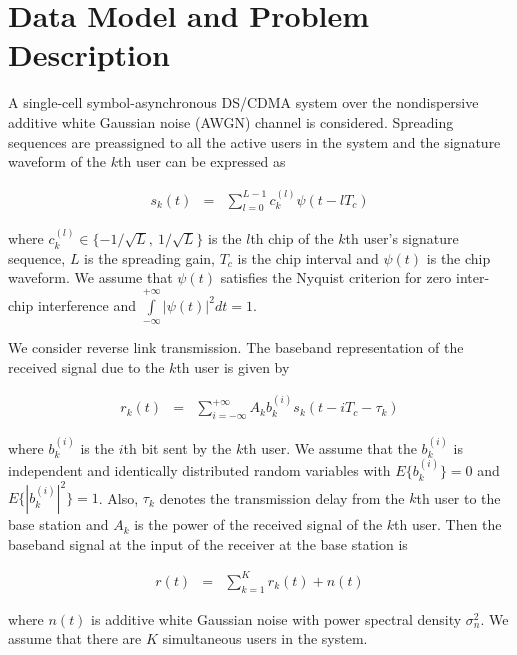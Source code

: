 \documentclass[a4paper,11pt,fleqn]{article}
\begin{document}
\section{Data Model and Problem Description}

A single-cell symbol-asynchronous DS/CDMA system over the
nondispersive additive white Gaussian noise (AWGN) channel is
considered. Spreading sequences are preassigned to all the active
users in the system and the signature waveform of the $k$th user
can be expressed as

\begin{equation}
\begin{array}{rcl}
s_k(t)&=&\sum\limits_{l=0}^{L-1}c_k^{(l)}\psi(t-lT_c)
\end{array}
\end{equation}

\noindent where $c_k^{(l)}\in \{-1/\sqrt{L},\ 1/\sqrt{L}\}$ is the
$l$th chip of the $k$th user's signature sequence, $L$ is the
spreading gain, $T_c$ is the chip interval and $\psi(t)$ is the
chip waveform. We assume that $\psi(t)$ satisfies the Nyquist
criterion for zero inter-chip interference and
$\int\limits_{-\infty}^{+\infty}|\psi(t)|^2dt=1$.

We consider reverse link transmission. The baseband representation
of the received signal due to the $k$th user is given by

\begin{equation}
\begin{array}{rcl}
r_k(t)&=&\sum\limits_{i=-\infty}^{+\infty}A_k b_k^{(i)}
s_k(t-iT_c-\tau_k)
\end{array}
\end{equation}

\noindent where $b_k^{(i)}$ is the $i$th bit sent by the $k$th
user. We assume that the $b_k^{(i)}$ is independent and
identically distributed random variables with $E\{b_k^{(i)}\}=0$
and $E\{|b_k^{(i)}|^2\}=1$. Also, $\tau_k$ denotes the
transmission delay from the $k$th user to the base station and
$A_k$ is the power of the received signal of the $k$th user. Then
the baseband signal at the input of the receiver at the base
station is

\begin{equation}
\begin{array}{rcl}
r(t)&=&\sum\limits_{k=1}^{K}r_k(t)+n(t)
\end{array}
\end{equation}

\noindent where $n(t)$ is additive white Gaussian noise with power
spectral density $\sigma_n^2$. We assume that there are $K$
simultaneous users in the system.
\end{document}
